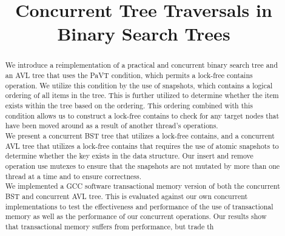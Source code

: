 \documentclass[conference]{IEEEtran}
\theoremstyle{definition}
\theoremstyle{theorem}
\begin{document}
\title{Concurrent Tree Traversals in Binary Search Trees\\
}

\author{
\and
{}
}

\maketitle

\begin{abstract}
We introduce a reimplementation of a practical and concurrent binary search tree and an AVL tree that uses the PaVT condition, which permits a lock-free contains operation. We utilize this condition by the use of snapshots, which contains a logical ordering of all items in the tree. This is further utilized to determine whether the item exists within the tree based on the ordering. This ordering combined with this condition allows us to construct a lock-free contains to check for any target nodes that have been moved around as a result of another thread's operations.\\
We present a concurrent BST tree that utilizes a lock-free contains, and a concurrent AVL tree that utilizes a lock-free contains that requires the use of atomic snapshots to determine whether the key exists in the data structure. Our insert and remove operation use mutexes to ensure that the snapshots are not mutated by more than one thread at a time and to ensure correctness. \\
We implemented a GCC software transactional memory version of both the concurrent BST and concurrent AVL tree. This is evaluated against our own concurrent implementations to test the effectiveness and performance of the use of transactional memory as well as the performance of our concurrent operations. Our results show that transactional  memory suffers from performance, but trade th
\end{abstract}
\end{document}
